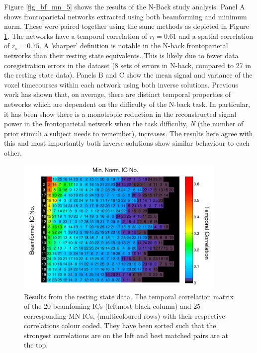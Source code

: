 Figure \ref{fig_bf_mn_5} shows the results of the N-Back study analysis. Panel A shows frontoparietal networks extracted using both beamforming and minimum norm. These were paired together using the same methods as depicted in Figure \ref{fig_bf_mn_3}. The networks have a temporal correlation of $r_t = 0.61$ and a spatial correlation of $r_s = 0.75$. A 'sharper' definition is notable in the N-back frontoparietal networks than their resting state equivalents. This is likely due to fewer data coregistration errors in the dataset (8 sets of errors in N-back, compared to 27 in the resting state data). Panels B and C show the mean signal and variance of the voxel timecourses within each network using both inverse solutions. Previous work \citep{Brookes2012a} has shown that, on average, there are distinct temporal properties of networks which are dependent on the difficulty of the N-back task. In particular, it has been show there is a monotropic reduction in the reconstructed signal power in the frontoparietal network when the task difficulty, \textit{N} (the number of prior stimuli a subject needs to remember), increases. The results here agree with this and most importantly both inverse solutions show similar behaviour to each other.


\begin{figure}[h!]
	\begin{centering}
		\includegraphics[width=0.9\textwidth]{./images/chapter2/CCmat_2sort.png}
		\caption{Results from the resting state data. The temporal correlation matrix of the 20 beamfoming ICs (leftmost black column) and 25 corresponding MN ICs, (multicoloured rows) with their respective correlations colour coded. They have been sorted such that the strongest correlations are on the left and  best matched pairs are at the top.}
		\label{fig_bf_mn_3}
	\end{centering}
\end{figure}


